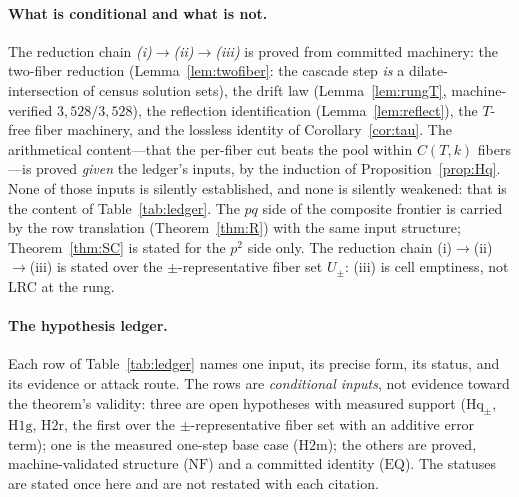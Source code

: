 \documentclass[11pt,a4paper]{article}
\numberwithin{equation}{section}
\theoremstyle{plain}
\theoremstyle{plain}
\theoremstyle{definition}
\theoremstyle{remark}
\begin{document}
\paragraph{What is conditional and what is not.}
The reduction chain \emph{(i)}$\to$\emph{(ii)}$\to$\emph{(iii)} is
proved from committed machinery: the two-fiber reduction
(Lemma~\ref{lem:twofiber}: the cascade step \emph{is} a
dilate-intersection of census solution sets), the drift law
(Lemma~\ref{lem:rungT}, machine-verified $3{,}528/3{,}528$), the
reflection identification (Lemma~\ref{lem:reflect}), the
$T$-free fiber machinery, and the lossless identity of
Corollary~\ref{cor:tau}. The arithmetical content---that the per-fiber
cut beats the pool within $C(T,k)$ fibers---is proved \emph{given} the
ledger's inputs, by the induction of Proposition~\ref{prop:Hq}. None of those inputs is silently established, and none
is silently weakened: that is the content of Table~\ref{tab:ledger}. The
$pq$ side of the composite frontier is carried by the row translation
(Theorem~\ref{thm:R}) with the same input structure; Theorem~\ref{thm:SC}
is stated for the $p^2$ side only. The reduction chain (i)$\to$(ii)$\to$(iii) is stated
over the $\pm$-representative fiber set $U_\pm$: (iii) is cell emptiness,
not LRC at the rung.

\paragraph{The hypothesis ledger.}
Each row of Table~\ref{tab:ledger} names one input, its precise form,
its status, and its evidence or attack route. The rows are
\emph{conditional inputs}, not evidence toward the theorem's validity:
three are open hypotheses with measured support ($\mathrm{Hq}_\pm$,
$\mathrm{H1g}$, $\mathrm{H2r}$, the first over the
$\pm$-representative fiber set with an additive error term); one is the measured one-step base case
($\mathrm{H2m}$); the others are proved, machine-validated structure
($\mathrm{NF}$) and a committed identity ($\mathrm{EQ}$). The statuses
are stated once here and are not restated with each citation.
\end{document}
